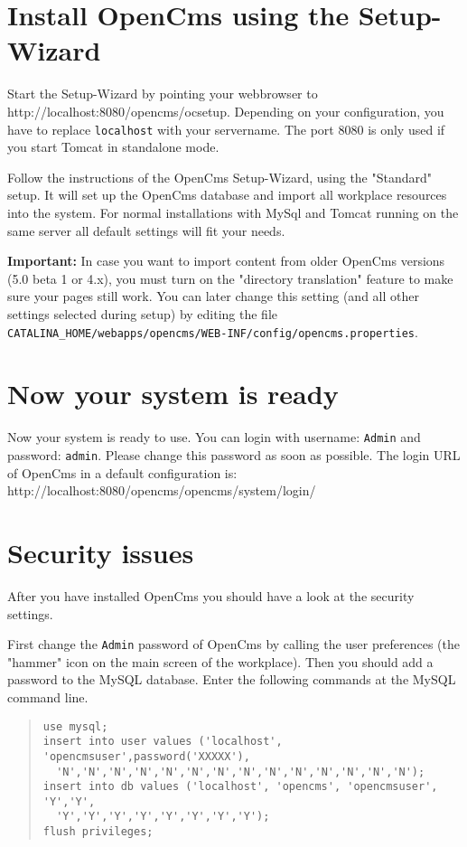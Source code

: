 \section{Install OpenCms using the Setup-Wizard}
Start the Setup-Wizard by pointing your webbrowser to\\
    {http://localhost:8080/opencms/ocsetup}.
Depending on your configuration, you have to replace \texttt{localhost} with your servername. 
The port 8080 is only used if you start Tomcat in standalone mode.

Follow the instructions of the OpenCms Setup-Wizard, using the "Standard" setup. It will set
up the OpenCms database and import all workplace resources into
the system. For normal installations with MySql and Tomcat running
on the same server all default settings will fit your needs.

\textbf{Important:} In case you want to import content from older OpenCms versions (5.0 beta 1 or 4.x), 
you must turn on the "directory translation" feature to make sure your pages still work. 
You can later change this setting (and all other settings selected during setup) 
by editing the file \texttt{CATALINA\_HOME/webapps/opencms/WEB-INF/config/opencms.properties}.

\section{Now your system is ready}
Now your system is ready to use. You can login with username:
\texttt{Admin} and password: \texttt{admin}. Please change this
password as soon as possible. The login URL of OpenCms in a default configuration is:\\
{http://localhost:8080/opencms/opencms/system/login/}

\section{Security issues}
After you have installed OpenCms you should have a look at the security settings.

First change the \texttt{Admin} password of OpenCms by calling the user
preferences (the "hammer" icon on the main screen of the workplace).
Then you should add a password to the MySQL database. Enter the following
commands at the MySQL command line.\\

\begin{quote}
\begin{verbatim}
use mysql;
insert into user values ('localhost', 'opencmsuser',password('XXXXX'),
  'N','N','N','N','N','N','N','N','N','N','N','N','N','N');
insert into db values ('localhost', 'opencms', 'opencmsuser', 'Y','Y',
  'Y','Y','Y','Y','Y','Y','Y','Y');
flush privileges;
\end{verbatim}
\end{quote}

